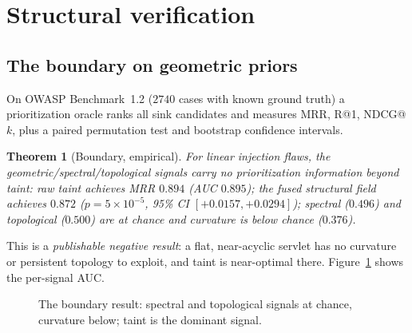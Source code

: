 \documentclass[journal]{IEEEtran}
\newtheorem{theorem}{Theorem}
\begin{document}
\section{Structural verification}
\label{sec:verification}

\subsection{The boundary on geometric priors}
\label{sec:boundary}
On OWASP Benchmark~1.2 \cite{owasp2015} ($2740$ cases with known ground truth) a
prioritization oracle ranks all sink candidates and measures MRR, R@1, NDCG@$k$,
plus a paired permutation test and bootstrap confidence intervals.

\begin{theorem}[Boundary, empirical]
\label{thm:boundary}
For linear injection flaws, the geometric/spectral/topological signals carry no
prioritization information beyond taint: raw taint achieves MRR $0.894$
(AUC $0.895$); the fused structural field achieves $0.872$
($p=5\times10^{-5}$, 95\% CI $[+0.0157,+0.0294]$); spectral ($0.496$) and
topological ($0.500$) are at chance and curvature is below chance ($0.376$).
\end{theorem}

This is a \emph{publishable negative result}: a flat, near-acyclic servlet has no
curvature or persistent topology to exploit, and taint is near-optimal there.
Figure~\ref{fig:boundary} shows the per-signal AUC.

\begin{figure}[!t]
\centering
{}
\caption{The boundary result: spectral and topological signals at chance,
curvature below; taint is the dominant signal.}
\label{fig:boundary}
\end{figure}
\end{document}
